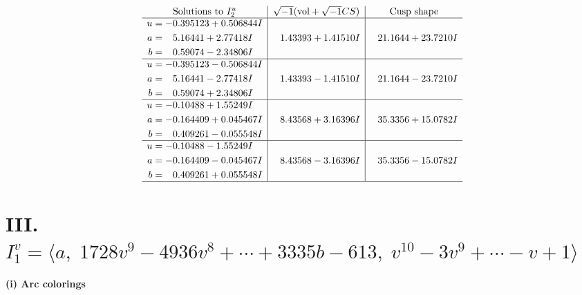 \documentclass[1p]{elsarticle_modified}
\theoremstyle{definition}
\newcommand{\I}{\sqrt{-1}}
\begin{document}
$$\begin{array}{c|c|c}  
\text{Solutions to }I^u_{2}& \I (\text{vol} + \sqrt{-1}CS) & \text{Cusp shape}\\
 \hline 
\begin{aligned}
u &= -0.395123 + 0.506844 I \\
a &= \phantom{-}5.16441 + 2.77418 I \\
b &= \phantom{-}0.59074 - 2.34806 I\end{aligned}
 & \phantom{-}1.43393 + 1.41510 I & \phantom{-}21.1644 + 23.7210 I \\ \hline\begin{aligned}
u &= -0.395123 - 0.506844 I \\
a &= \phantom{-}5.16441 - 2.77418 I \\
b &= \phantom{-}0.59074 + 2.34806 I\end{aligned}
 & \phantom{-}1.43393 - 1.41510 I & \phantom{-}21.1644 - 23.7210 I \\ \hline\begin{aligned}
u &= -0.10488 + 1.55249 I \\
a &= -0.164409 + 0.045467 I \\
b &= \phantom{-}0.409261 - 0.055548 I\end{aligned}
 & \phantom{-}8.43568 + 3.16396 I & \phantom{-}35.3356 + 15.0782 I \\ \hline\begin{aligned}
u &= -0.10488 - 1.55249 I \\
a &= -0.164409 - 0.045467 I \\
b &= \phantom{-}0.409261 + 0.055548 I\end{aligned}
 & \phantom{-}8.43568 - 3.16396 I & \phantom{-}35.3356 - 15.0782 I\\
 \hline 
 \end{array}$$\newpage\newpage\renewcommand{\arraystretch}{1}
\centering \section*{III. $I^v_{1}= \langle a,\;1728 v^9-4936 v^8+\cdots+3335 b-613,\;v^{10}-3 v^9+\cdots- v+1 \rangle$}
\flushleft \textbf{(i) Arc colorings}\\
\end{document}
